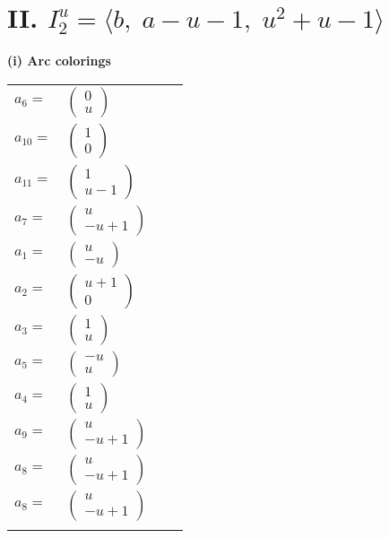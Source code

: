\documentclass[1p]{elsarticle_modified}
\theoremstyle{definition}
\begin{document}
\centering \section*{II. $I^u_{2}= \langle b,\;a- u-1,\;u^2+u-1 \rangle$}
\flushleft \textbf{(i) Arc colorings}\\
\begin{tabular}{m{7pt} m{180pt} m{7pt} m{180pt} }
\flushright $a_{6}=$&$\begin{pmatrix}0\\u\end{pmatrix}$ \\
\flushright $a_{10}=$&$\begin{pmatrix}1\\0\end{pmatrix}$ \\
\flushright $a_{11}=$&$\begin{pmatrix}1\\u-1\end{pmatrix}$ \\
\flushright $a_{7}=$&$\begin{pmatrix}u\\- u+1\end{pmatrix}$ \\
\flushright $a_{1}=$&$\begin{pmatrix}u\\- u\end{pmatrix}$ \\
\flushright $a_{2}=$&$\begin{pmatrix}u+1\\0\end{pmatrix}$ \\
\flushright $a_{3}=$&$\begin{pmatrix}1\\u\end{pmatrix}$ \\
\flushright $a_{5}=$&$\begin{pmatrix}- u\\u\end{pmatrix}$ \\
\flushright $a_{4}=$&$\begin{pmatrix}1\\u\end{pmatrix}$ \\
\flushright $a_{9}=$&$\begin{pmatrix}u\\- u+1\end{pmatrix}$ \\
\flushright $a_{8}=$&$\begin{pmatrix}u\\- u+1\end{pmatrix}$\\ \flushright $a_{8}=$&$\begin{pmatrix}u\\- u+1\end{pmatrix}$\\&\end{tabular}
\end{document}
